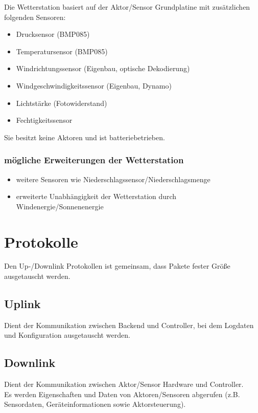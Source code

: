 \documentclass[12pt,a4paper]{article}
\begin{document}
Die Wetterstation basiert auf der Aktor/Sensor Grundplatine mit zusätzlichen folgenden Sensoren:

\begin{itemize}
	\item Drucksensor (BMP085)
	\item Temperatursensor (BMP085)
	\item Windrichtungssensor (Eigenbau, optische Dekodierung)
	\item Windgeschwindigkeitssensor (Eigenbau, Dynamo)
	\item Lichtstärke (Fotowiderstand)
	\item Fechtigkeitssensor
\end{itemize}

Sie besitzt keine Aktoren und ist batteriebetrieben.

\subsubsection{mögliche Erweiterungen der Wetterstation}

\begin{itemize}
	\item weitere Sensoren wie Niederschlagssensor/Niederschlagsmenge
	\item erweiterte Unabhängigkeit der Wetterstation durch Windenergie/Sonnenenergie
\end{itemize}

\section{Protokolle}

Den Up-/Downlink Protokollen ist gemeinsam, dass Pakete fester Größe ausgetauscht werden.

\subsection{Uplink}
\label{subsec:uplink}

Dient der Kommunikation zwischen Backend und Controller, bei dem Logdaten und Konfiguration ausgetauscht werden.

\subsection{Downlink}
\label{subsec:downlink}

Dient der Kommunikation zwischen Aktor/Sensor Hardware und Controller.\\
Es werden Eigenschaften und Daten von Aktoren/Sensoren abgerufen (z.B. Sensordaten, Geräteinformationen sowie Aktorsteuerung). 
\end{document}
